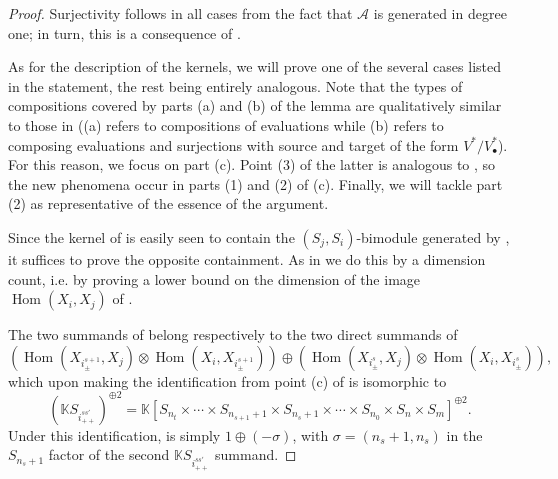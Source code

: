 \documentclass[11pt]{article}
\theoremstyle{plain}
\theoremstyle{nonumberplain}
\theoremstyle{plain}
\theoremstyle{nonumberplain}
\newtheorem{proof}{Proof}
\newcommand\bK{\mathbb K}
\newcommand\cA{\mathcal A}
\DeclareMathOperator{\Hom}{\mathrm{Hom}}
\begin{document}
\begin{proof}
  Surjectivity follows in all cases from the fact that $\cA$ is
  generated in degree one; in turn, this is a consequence of
  .

  As for the description of the kernels, we will prove one of the
  several cases listed in the statement, the rest being entirely
  analogous.
  Note that the types of compositions covered by parts (a) and (b) of
  the lemma are qualitatively similar to those in \cite[Lemma 3.26,
  (a) and (b)]{us} ((a) refers to compositions of evaluations while
  (b) refers to composing evaluations and surjections with source and
  target of the form $V^*/V^*_{\bullet}$). For this reason, we focus
  on part (c). Point (3) of the latter is analogous to \cite[Lemma
  3.26 (c)]{us}, so the new phenomena occur in parts (1) and (2) of
  (c). Finally, we will tackle part (2) as representative of the
  essence of the argument.

  Since the kernel of  is easily seen to contain the
  $(S_j,S_i)$-bimodule generated by , it suffices to
  prove the opposite containment. As in \cite[Lemma 3.26]{us} we do
  this by a dimension count, i.e. by proving a lower
  bound on the dimension of the image $\Hom(X_i,X_j)$ of
  .
  
  The two summands of  belong respectively to the two direct
  summands of
  \begin{equation*}
    \left(\Hom(X_{i^{s+1}_{\pm}},X_j)\otimes
      \Hom(X_i,X_{i^{s+1}_{\pm}})\right)\oplus \left(\Hom(X_{i^s_{\pm}},X_j)\otimes\Hom(X_i,X_{i^s_{\pm}})\right), 
  \end{equation*}
  which upon making the identification from point (c) of
   is isomorphic to
  \begin{equation*}
    \left(\bK S_{i^{ss'}_{++}}\right)^{\oplus 2} = \bK [S_{n_t}\times\cdots \times S_{n_{s+1}+1}\times S_{n_s+1}\times\cdots\times S_{n_0}\times S_n\times S_m]^{\oplus 2}. 
  \end{equation*}
  Under this identification,  is simply
  $1\oplus (-\sigma)$, with $\sigma=(n_s+1,n_s)$ in the $S_{n_s+1}$
  factor of the second $\bK S_{i^{ss'}_{++}}$ summand.


\end{proof}
\end{document}
